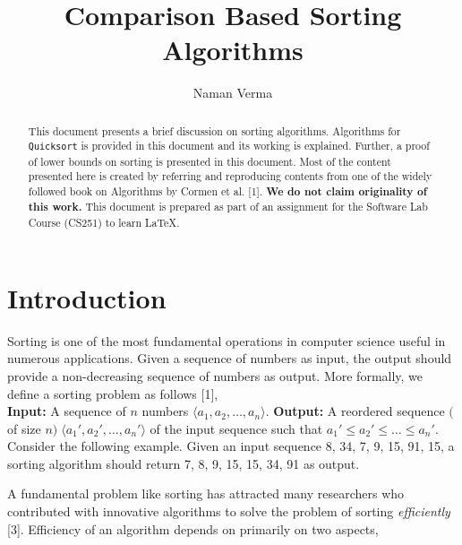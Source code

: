 \documentclass[a4paper, 10pt, twocolumn]{article}
\title{Comparison Based Sorting Algorithms}
\author{Naman Verma}
\date{}
\begin{document}
\maketitle

\begin{abstract}
This document presents a brief discussion on sorting algorithms. Algorithms for \texttt{Quicksort} is provided in this document and its working is explained. Further, a proof of lower bounds on sorting is presented in this document. Most of the content presented here is created by referring and reproducing contents from one of the widely followed book on Algorithms by Cormen et al. [1]. \textbf{We do not claim originality of this work.} This document is prepared as part of an assignment for the Software Lab Course (CS251) to learn \LaTeX.\\
\noindent {}
\end{abstract}

\section{Introduction}

Sorting is one of the most fundamental operations in computer science useful in numerous applications. Given a sequence of numbers as input, the output should provide a non-decreasing sequence of numbers as output. More formally, we define a sorting problem as follows [1],\\
\textbf{Input:} A sequence of $n$ numbers $\langle a_1,a_2,\dots,a_n\rangle$.
\textbf{Output:} A reordered sequence $($of size $n)\;\langle a_1',a_2',\dots,a_n'\rangle$ of the input sequence such that $a_1'\leq a_2'\leq \dots\leq a_n'$.\\
Consider the following example. Given an input sequence 8, 34, 7, 9, 15, 91, 15, a sorting algorithm should return 7, 8, 9, 15, 15, 34, 91 as output.\par
A fundamental problem like sorting has attracted many researchers who contributed with innovative algorithms to solve the problem of sorting \textit{efficiently} [3]. Efficiency of an algorithm depends on primarily on two aspects,
\end{document}

